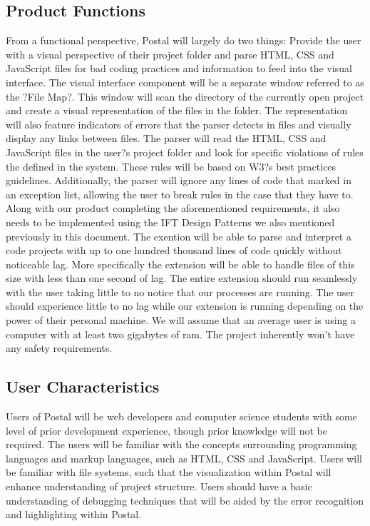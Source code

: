 \documentclass[letterpaper,10pt,titlepage,draftclsnofoot,onecolumn,onesided] {IEEEtran}
\begin{document}
\subsection{Product Functions}
From a functional perspective, Postal will largely do two things: Provide the user with a visual perspective of their project folder and parse HTML, CSS and JavaScript files for bad coding practices and information to feed into the visual interface. 
The visual interface component will be a separate window referred to as the ?File Map?. This window will scan the directory of the currently open project and create a visual representation of the files in the folder. The representation will also feature indicators of errors that the parser detects in files and visually display any links between files.
The parser will read the HTML, CSS and JavaScript files in the user?s project folder and look for specific violations of rules the defined in the system. These rules will be based on W3?s best practices guidelines. Additionally, the parser will ignore any lines of code that marked in an exception list, allowing the user to break rules in the case that they have to.
Along with our product completing the aforementioned requirements, it also needs to be implemented using the IFT Design Patterns we also mentioned previously in this document.
The exention will be able to parse and interpret a code projects with up to one hundred thousand lines of code quickly without noticeable lag. 
More specifically the extension will be able to handle files of this size with less than one second of lag.
The entire extension should run seamlessly with the user taking little to no notice that our processes are running. 
The user should experience little to no lag while our extension is running depending on the power of their personal machine.
We will assume that an average user is using a computer with at least two gigabytes of ram. 
The project inherently won't have any safety requirements. 

\subsection{User Characteristics}
Users of Postal will be web developers and computer science students with some level of prior development experience, though prior knowledge will not be required. The users will be familiar with the concepts surrounding programming languages and markup languages, such as HTML, CSS and JavaScript. 
Users will be familiar with file systems, such that the visualization within Postal will enhance understanding of project structure. 
Users should have a basic understanding of debugging techniques that will be aided by the error recognition and highlighting within Postal.
\end{document}
